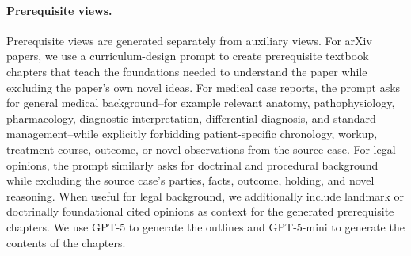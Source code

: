 \paragraph{Prerequisite views.}
Prerequisite views are generated separately from auxiliary views.  For arXiv papers, we use a curriculum-design prompt to create prerequisite textbook chapters that teach the foundations needed to understand the paper while excluding the paper's own novel ideas.  For medical case reports, the prompt asks for general medical background--for example relevant anatomy, pathophysiology, pharmacology, diagnostic interpretation, differential diagnosis, and standard management--while explicitly forbidding patient-specific chronology, workup, treatment course, outcome, or novel observations from the source case.  For legal opinions, the prompt similarly asks for doctrinal and procedural background while excluding the source case's parties, facts, outcome, holding, and novel reasoning. When useful for legal background, we additionally include landmark or doctrinally foundational cited opinions as context for the generated prerequisite chapters. We use GPT-5 to generate the outlines and GPT-5-mini to generate the contents of the chapters.
